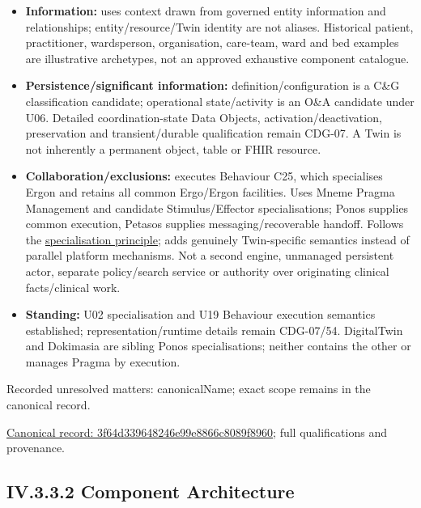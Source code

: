 \begin{itemize}
\item \textbf{Information:} uses context drawn from governed entity information and
  relationships; entity/resource/Twin identity are not aliases. Historical patient,
  practitioner, wardsperson, organisation, care-team, ward and bed examples are
  illustrative archetypes, not an approved exhaustive component catalogue.

\item \textbf{Persistence/significant information:} definition/configuration is a C\&G
  classification candidate; operational state/activity is an O\&A candidate under
  U06. Detailed coordination-state Data Objects, activation/deactivation,
  preservation and transient/durable qualification remain CDG-07. A Twin is not
  inherently a permanent object, table or FHIR resource.

\item \textbf{Collaboration/exclusions:} executes Behaviour C25, which specialises Ergon
  and retains all common Ergo/Ergon facilities. Uses Mneme Pragma Management and
  candidate Stimulus/Effector specialisations; Ponos supplies common execution,
  Petasos supplies messaging/recoverable handoff. Follows the
  \href{\detokenize{../../../../../../../../docs/markdown/05-information-systems-architecture/README.md#specialisation-principle}}{specialisation principle}; adds genuinely
  Twin-specific semantics instead of parallel platform mechanisms.
  Not a second engine, unmanaged persistent actor, separate
  policy/search service or authority over originating clinical facts/clinical work.

\item \textbf{Standing:} U02 specialisation and U19 Behaviour execution semantics established;
  representation/runtime details remain CDG-07/54. DigitalTwin and Dokimasia are sibling
  Ponos specialisations; neither contains the other or manages Pragma by execution.

\end{itemize}

{\small Recorded unresolved matters: canonicalName; exact scope remains in the canonical record.}\par
{\footnotesize \href{../../../../../../../continuum/application/application-component/3f64d339648246e99e8866c8089f8960.md}{Canonical record: 3f64d339648246e99e8866c8089f8960}; full qualifications and provenance.}\par
\subsection*{IV.3.3.2 Component Architecture}
\label{navigation:IV.3.3.2}

